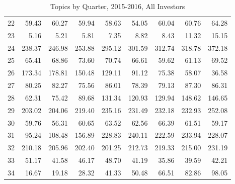 \begin{table}[]
\begin{tabular}{l|rrrrrrrr}
		22 & 59.43 & 60.27 & 59.94 & 58.63 & 54.05 & 60.04 & 60.76 & 64.28 \\
		23 & 5.16 & 5.21 & 5.81 & 7.35 & 8.82 & 8.43 & 11.32 & 15.15 \\
		24 & 238.37 & 246.98 & 253.88 & 295.12 & 301.59 & 312.74 & 318.78 & 372.18 \\
		25 & 65.41 & 68.86 & 73.60 & 70.74 & 66.61 & 59.62 & 61.13 & 69.52 \\
		26 & 173.34 & 178.81 & 150.48 & 129.11 & 91.12 & 75.38 & 58.07 & 36.58 \\
		27 & 80.25 & 82.27 & 75.56 & 86.01 & 78.39 & 79.13 & 87.30 & 86.31 \\
		28 & 62.31 & 75.42 & 89.68 & 131.34 & 120.93 & 129.94 & 148.62 & 146.65 \\
		29 & 203.02 & 204.06 & 219.40 & 235.16 & 231.49 & 232.18 & 232.93 & 252.08 \\
		30 & 59.76 & 56.31 & 60.65 & 63.52 & 62.56 & 66.39 & 61.51 & 59.17 \\
		31 & 95.24 & 108.48 & 156.89 & 228.83 & 240.11 & 222.59 & 233.94 & 228.07 \\
		32 & 210.18 & 205.96 & 202.40 & 201.25 & 212.73 & 219.33 & 215.00 & 231.19 \\
		33 & 51.17 & 41.58 & 46.17 & 48.70 & 41.19 & 35.86 & 39.59 & 42.21 \\
		34 & 16.67 & 19.18 & 28.32 & 41.33 & 50.48 & 66.51 & 82.86 & 98.05
	\end{tabular}
\caption[Topics by Quarter, 2015-2016, All Investors]{Topics by Quarter, 2015-2016, All Investors}
\label{tab:Topics_investors_2015-2016}
\end{table}

